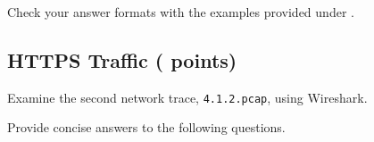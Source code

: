 Check your answer formats with the examples provided under \textit{}.

\newpage

\subsection{HTTPS Traffic ( points)}
\label{sec:cp1.2}
Examine the second network trace, \texttt{4.1.2.pcap}, using Wireshark.

\medskip

Provide concise answers to the following questions.

\newcommand{\fileyear}{\ref*{sec:cp1.2}.\ref*{itm:year}.txt}
\newcommand{\filedomain}{\ref*{sec:cp1.2}.\ref*{itm:domain}.txt}
\newcommand{\filecslist}{\ref*{sec:cp1.2}.\ref*{itm:cslist}.txt}
\newcommand{\fileservercs}{\ref*{sec:cp1.2}.\ref*{itm:servercs}.txt}
\newcommand{\filename}{\ref*{sec:cp1.2}.\ref*{itm:name}.txt}
\newcommand{\filemsg}{\ref*{sec:cp1.2}.\ref*{itm:msg}.txt}
\newcommand{\filecookie}{\ref*{sec:cp1.2}.\ref*{itm:cookie}.txt}

